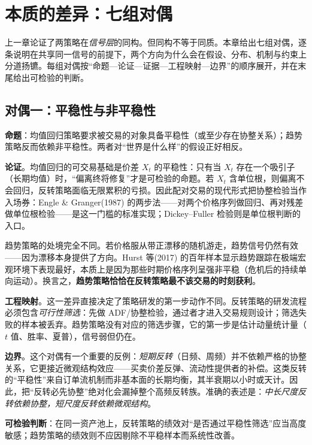 \section{本质的差异：七组对偶}\label{sec:duality}

上一章论证了两策略在\emph{信号层}的同构。但同构不等于同质。本章给出七组对偶，逐条说明在共享同一信号的前提下，两个方向为什么会在假设、分布、机制与约束上分道扬镳。每组对偶按“命题—论证—证据—工程映射—边界”的顺序展开，并在末尾给出可检验的判断。

\subsection{对偶一：平稳性与非平稳性}

\textbf{命题}：均值回归策略要求被交易的对象具备平稳性（或至少存在协整关系）；趋势策略反而依赖非平稳性。两者对“世界是什么样”的假设正好相反。

\textbf{论证}。均值回归的可交易基础是价差 $X_t$ 的平稳性：只有当 $X_t$ 存在一个吸引子（长期均值）时，“偏离终将修复”才是可检验的命题。若 $X_t$ 含单位根，则偏离不会回归，反转策略面临无限累积的亏损。因此配对交易的现代形式把协整检验当作入场券：Engle \& Granger(1987) 的两步法——对两个价格序列做回归、再对残差做单位根检验——是这一门槛的标准实现\cite{englegranger1987}；Dickey--Fuller 检验则是单位根判断的入口\cite{dickeyfuller1979}。

趋势策略的处境完全不同。若价格服从带正漂移的随机游走，趋势信号仍然有效——因为漂移本身提供了方向。Hurst 等(2017) 的百年样本显示趋势跟踪在极端宏观环境下表现最好，本质上是因为那些时期价格序列呈强非平稳（危机后的持续单向运动）\cite{hop2017}。换言之，\textbf{趋势策略恰恰在反转策略最不该交易的时刻获利}。

\textbf{工程映射}。这一差异直接决定了策略研发的第一步动作不同。反转策略的研发流程必须包含\emph{可行性筛选}：先做 ADF/协整检验，通过者才进入交易规则设计；筛选失败的样本被丢弃。趋势策略没有对应的筛选步骤，它的第一步是估计动量统计量（$t$ 值、胜率、夏普），信号弱但仍在。

\textbf{边界}。这个对偶有一个重要的反例：\emph{短期反转}（日频、周频）并不依赖严格的协整关系，它更接近微观结构效应——买卖价差反弹、流动性提供者的补偿。这类反转的“平稳性”来自订单流机制而非基本面的长期均衡，其半衰期以小时或天计。因此，把“反转必先协整”绝对化会漏掉整个高频反转族。准确的表述是：\emph{中长尺度反转依赖协整，短尺度反转依赖微观结构}。

\textbf{可检验判断}：在同一资产池上，反转策略的绩效对“是否通过平稳性筛选”应当高度敏感；趋势策略的绩效则不应因剔除不平稳样本而系统性改善。


